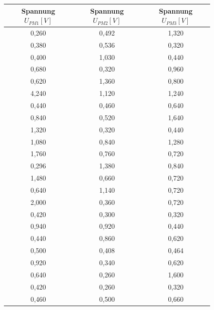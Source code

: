             \begin{figure}[htbp]
               \tiny\centering
                    \begin{tabular}{c|c|c}
                         Spannung $U_{PM1} [\unit{V}]$ & Spannung $U_{PM2} [\unit{V}]$ & Spannung $U_{PM3} [\unit{V}]$ \\ 
                   \hline       0,260 & 0,492 & 1,320\\
                                0,380 & 0,536 & 0,320\\
                                0,400 & 1,030 & 0,440\\
                                0,680 & 0,320 & 0,960\\
                                0,620 & 1,360 & 0,800\\
                                4,240 & 1,120 & 1,240\\
                                0,440 & 0,460 & 0,640\\
                                0,840 & 0,520 & 1,640\\
                                1,320 & 0,320 & 0,440\\
                                1,080 & 0,840 & 1,280\\
                                1,760 &	0,760 & 0,720\\
                                0,296 & 1,380 & 0,840\\
                                1,480 & 0,660 & 0,720\\
                                0,640 & 1,140 & 0,720\\
                                2,000 & 0,360 & 0,720\\
                                0,420 & 0,300 & 0,320\\
                                0,940 & 0,920 & 0,440\\
                                0,440 & 0,860 & 0,620\\
                                0,500 & 0,408 & 0,464\\
                                0,920 & 0,340 & 0,620\\
                                0,640 & 0,260 & 1,600\\
                                0,420 & 0,260 & 0,320\\
                                0,460 & 0,500 & 0,660\\

\end{tabular}
\end{figure}

